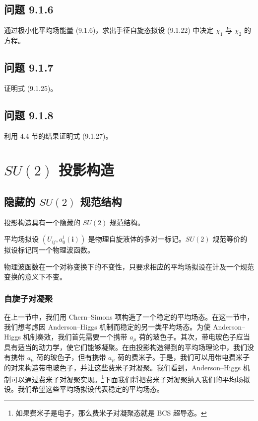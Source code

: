 \subsection*{问题 9.1.6}

通过极小化平均场能量 (9.1.6)，求出手征自旋态拟设 (9.1.22) 中决定 $\chi_1$ 与 $\chi_2$ 的方程。

\subsection*{问题 9.1.7}

证明式 (9.1.25)。

\subsection*{问题 9.1.8}

利用 4.4 节的结果证明式 (9.1.27)。

\section{$SU(2)$ 投影构造}

\subsection{隐藏的 $SU(2)$ 规范结构}

\begin{keypoints}
\item 投影构造具有一个隐藏的 $SU(2)$ 规范结构。
\item 平均场拟设 $(U_{ij},a^l_0(\pmb{i}))$ 是物理自旋液体的多对一标记。$SU(2)$ 规范等价的拟设标记同一个物理波函数。
\item 物理波函数在一个对称变换下的不变性，只要求相应的平均场拟设在计及一个规范变换的意义下不变。
\end{keypoints}

\subsubsection{自旋子对凝聚}

在上一节中，我们用 Chern--Simons 项构造了一个稳定的平均场态。在这一节中，我们想考虑因 Anderson--Higgs 机制而稳定的另一类平均场态。为使 Anderson--Higgs 机制奏效，我们首先需要一个携带 $a_{\mu}$ 荷的玻色子。其次，带电玻色子应当具有适当的动力学，使它们能够凝聚。在由投影构造得到的平均场理论中，我们没有携带 $a_{\mu}$ 荷的玻色子，但有携带 $a_{\mu}$ 荷的费米子。于是，我们可以用带电费米子的对来构造带电玻色子，并让这些费米子对凝聚。我们看到，Anderson--Higgs 机制可以通过费米子对凝聚实现。\footnote{如果费米子是电子，那么费米子对凝聚态就是 BCS 超导态。}下面我们将把费米子对凝聚纳入我们的平均场拟设。我们希望这些平均场拟设代表稳定的平均场态。

